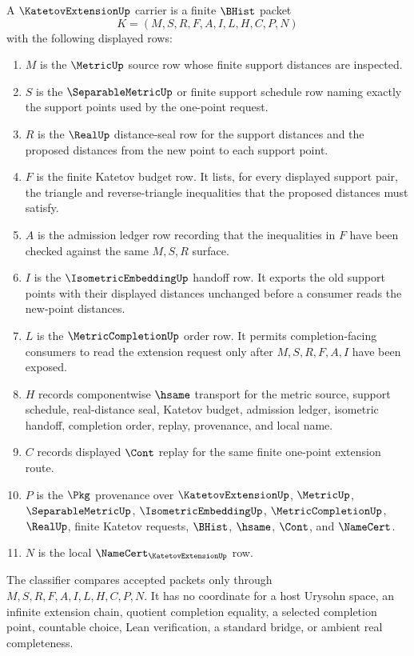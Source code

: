 \begin{definition}
\label{def:katetov-extension-carrier}
A $\KatetovExtensionUp$ carrier is a finite $\BHist$ packet
$$
K=(M,S,R,F,A,I,L,H,C,P,N)
$$
with the following displayed rows:
\begin{enumerate}
\item $M$ is the $\MetricUp$ source row whose finite support distances are inspected.
\item $S$ is the $\SeparableMetricUp$ or finite support schedule row naming exactly the support points used by the one-point request.
\item $R$ is the $\RealUp$ distance-seal row for the support distances and the proposed distances from the new point to each support point.
\item $F$ is the finite Katetov budget row. It lists, for every displayed support pair, the triangle and reverse-triangle inequalities that the proposed distances must satisfy.
\item $A$ is the admission ledger row recording that the inequalities in $F$ have been checked against the same $M,S,R$ surface.
\item $I$ is the $\IsometricEmbeddingUp$ handoff row. It exports the old support points with their displayed distances unchanged before a consumer reads the new-point distances.
\item $L$ is the $\MetricCompletionUp$ order row. It permits completion-facing consumers to read the extension request only after $M,S,R,F,A,I$ have been exposed.
\item $H$ records componentwise $\hsame$ transport for the metric source, support schedule, real-distance seal, Katetov budget, admission ledger, isometric handoff, completion order, replay, provenance, and local name.
\item $C$ records displayed $\Cont$ replay for the same finite one-point extension route.
\item $P$ is the $\Pkg$ provenance over $\KatetovExtensionUp$, $\MetricUp$, $\SeparableMetricUp$, $\IsometricEmbeddingUp$, $\MetricCompletionUp$, $\RealUp$, finite Katetov requests, $\BHist$, $\hsame$, $\Cont$, and $\NameCert$.
\item $N$ is the local $\NameCert_{\KatetovExtensionUp}$ row.
\end{enumerate}
The classifier compares accepted packets only through $M,S,R,F,A,I,L,H,C,P,N$. It has no coordinate for a host Urysohn space, an infinite extension chain, quotient completion equality, a selected completion point, countable choice, Lean verification, a standard bridge, or ambient real completeness.
\end{definition}

